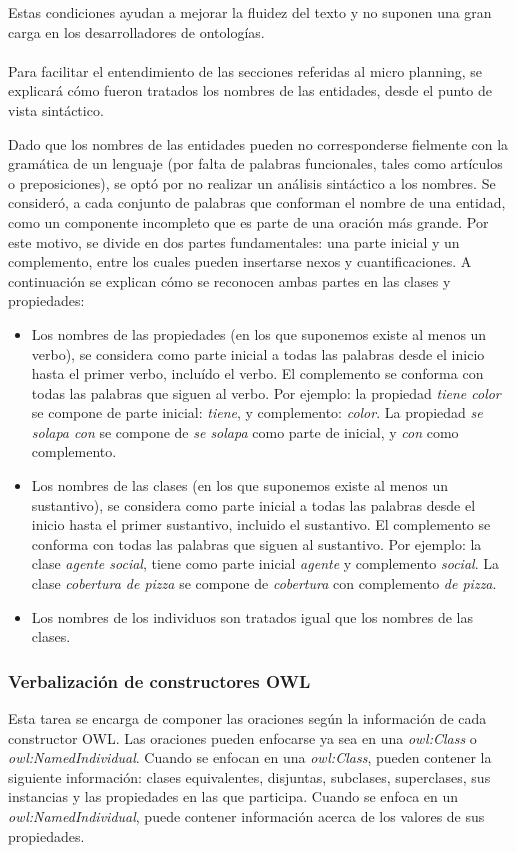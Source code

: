 Estas condiciones ayudan a mejorar la fluidez del texto y no suponen una gran carga en los desarrolladores de ontologías.
\\

\\
Para facilitar el entendimiento de las secciones referidas al micro planning, se explicará cómo fueron tratados los nombres de las entidades, desde el punto de vista sintáctico. 

Dado que los nombres de las entidades pueden no corresponderse fielmente con la gramática de un lenguaje (por falta de palabras funcionales, tales como artículos o preposiciones), se optó por no realizar un análisis sintáctico a los nombres. Se consideró, a cada conjunto de palabras que conforman el nombre de una entidad, como un componente incompleto que es parte de una oración más grande. Por este motivo, se divide en dos partes fundamentales: una parte inicial y un complemento, entre los cuales pueden insertarse nexos y cuantificaciones. A continuación se explican cómo se reconocen ambas partes en las clases y propiedades:
\begin{itemize}
    \item Los nombres de las propiedades (en los que suponemos existe al menos un verbo), se considera como parte inicial a todas las palabras desde el inicio hasta el primer verbo, incluído el verbo. El complemento se conforma con todas las palabras que siguen al verbo. Por ejemplo: la propiedad \emph{tiene color} se compone de parte inicial: \emph{tiene}, y complemento: \emph{color}. La propiedad \emph{se solapa con} se compone de \emph{se solapa} como parte de inicial, y \emph{con} como complemento.
    \item Los nombres de las clases (en los que suponemos existe al menos un sustantivo), se considera como parte inicial a todas las palabras desde el inicio hasta el primer sustantivo, incluido el sustantivo. El complemento se conforma con todas las palabras que siguen al sustantivo. Por ejemplo: la clase \emph{agente social}, tiene como parte inicial \emph{agente} y complemento \emph{social}. La clase \emph{cobertura de pizza} se compone de \emph{cobertura} con complemento \emph{de pizza}.
    \item Los nombres de los individuos son tratados igual que los nombres de las clases.
\end{itemize}


\subsubsection{Verbalización de constructores OWL}
Esta tarea se encarga de componer las oraciones según la información de cada constructor OWL. Las oraciones pueden enfocarse ya sea en una \emph{owl:Class} o  \emph{owl:NamedIndividual}. Cuando se enfocan en una \emph{owl:Class}, pueden contener la siguiente información: clases equivalentes, disjuntas, subclases, superclases, sus instancias y las propiedades en las que participa. Cuando se enfoca en un \emph{owl:NamedIndividual}, puede contener información acerca de los valores de sus propiedades.

